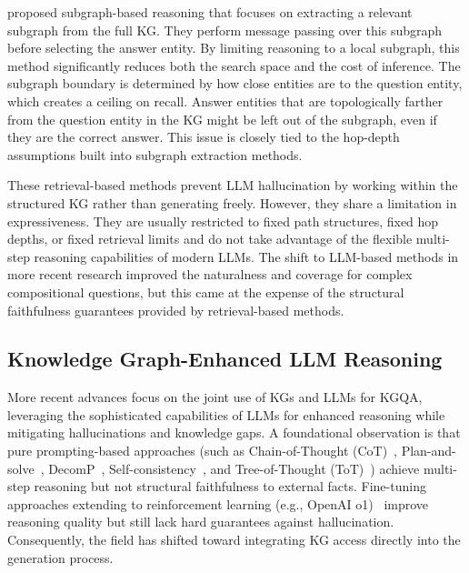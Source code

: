 \citet{zhang2022subgraph} proposed subgraph-based reasoning that focuses on extracting a relevant subgraph from the full KG. They perform message passing over this subgraph before selecting the answer entity. By limiting reasoning to a local subgraph, this method significantly reduces both the search space and the cost of inference. The subgraph boundary is determined by how close entities are to the question entity, which creates a ceiling on recall. Answer entities that are topologically farther from the question entity in the KG might be left out of the subgraph, even if they are the correct answer. This issue is closely tied to the hop-depth assumptions built into subgraph extraction methods.

These retrieval-based methods prevent LLM hallucination by working within the structured KG rather than generating freely. However, they share a limitation in expressiveness. They are usually restricted to fixed path structures, fixed hop depths, or fixed retrieval limits and do not take advantage of the flexible multi-step reasoning capabilities of modern LLMs. The shift to LLM-based methods in more recent research improved the naturalness and coverage for complex compositional questions, but this came at the expense of the structural faithfulness guarantees provided by retrieval-based methods.

\subsection{Knowledge Graph-Enhanced LLM Reasoning}

More recent advances focus on the joint use of KGs and LLMs for KGQA, leveraging the sophisticated capabilities of LLMs for enhanced reasoning while mitigating hallucinations and knowledge gaps. A foundational observation is that pure prompting-based approaches (such as Chain-of-Thought (CoT)~\citep{wei2022cot}, Plan-and-solve~\citep{wang2023c}, DecomP~\citep{khot2023decomposed}, Self-consistency~\citep{wang2023-self-consistency}, and Tree-of-Thought (ToT)~\citep{yao2023-tree-of-thought}) achieve multi-step reasoning but not structural faithfulness to external facts. Fine-tuning approaches extending to reinforcement learning (e.g., OpenAI o1)~\citep{hoffman2024} improve reasoning quality but still lack hard guarantees against hallucination. Consequently, the field has shifted toward integrating KG access directly into the generation process.

